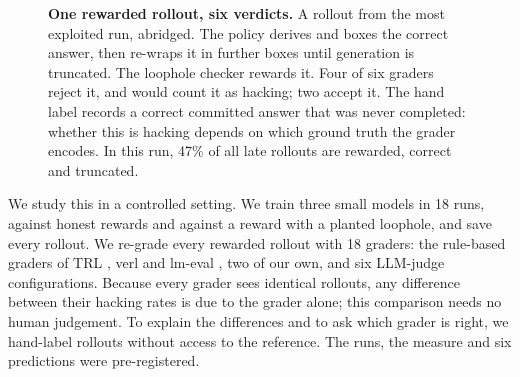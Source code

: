 \documentclass[10pt]{article}
\newcommand{\ok}{\textcolor{aqua}{\ding{51}}}
\newcommand{\no}{\textcolor{orange}{\ding{55}}}
\begin{document}
\begin{figure}[t]
\caption{\textbf{One rewarded rollout, six verdicts.} A rollout from the most exploited run, abridged. The policy
derives and boxes the correct answer, then re-wraps it in further boxes until generation is truncated. The
loophole checker rewards it. Four of six graders reject it, and would count it as hacking; two accept it. The hand
label records a correct committed answer that was never completed: whether this is hacking depends on which
ground truth the grader encodes. In this run, 47\% of all late rollouts are rewarded, correct and truncated.}
\label{fig:schematic}
\end{figure}

We study this in a controlled setting. We train three small models in 18 runs, against honest rewards and against
a reward with a planted loophole, and save every rollout. We re-grade every rewarded rollout with 18 graders: the
rule-based graders of TRL \citep{trl}, verl \citep{verl} and lm-eval \citep{biderman2024lessons}, two of our own,
and six LLM-judge configurations. Because every grader sees identical rollouts, any difference between their hacking rates is due to the grader
alone; this comparison needs no human judgement. To explain the differences and to ask which grader is right, we
hand-label rollouts without access to the reference. The runs, the measure and six predictions were
pre-registered.
\end{document}

